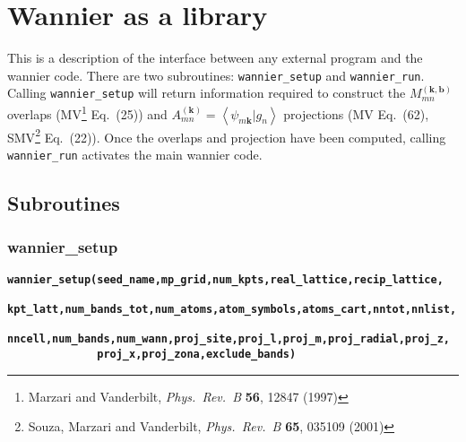 \chapter{Wannier as a library}

This is a description of the interface between any external program and
the wannier code. There are two subroutines: \verb#wannier_setup# and
\verb#wannier_run#. Calling \verb#wannier_setup# will return
information required to 
construct the $M_{mn}^{(\mathbf{k,b})}$ overlaps (MV\footnote{Marzari
  and Vanderbilt, \textit{Phys.~Rev.~B} \textbf{56}, 12847 (1997)}
Eq.~(25)) and $A_{mn}^{(\mathbf{k})}=\left\langle
\psi_{m\mathbf{k}}|g_{n}\right\rangle$ projections (MV
Eq.~(62), SMV\footnote{Souza, Marzari and Vanderbilt,
  \textit{Phys.~Rev.~B} \textbf{65}, 035109 (2001)} Eq.~(22)). Once 
the overlaps and projection have been computed, calling
\verb#wannier_run# activates the main wannier code.


\section{Subroutines}

\subsection{wannier\_setup}

{\noindent \bf \verb#wannier_setup(seed_name,mp_grid,num_kpts,real_lattice,recip_lattice,#\\
\verb#              kpt_latt,num_bands_tot,num_atoms,atom_symbols,atoms_cart,nntot,nnlist,#\\
\verb#              nncell,num_bands,num_wann,proj_site,proj_l,proj_m,proj_radial,proj_z,#\\
\verb#              proj_x,proj_zona,exclude_bands)   #}

